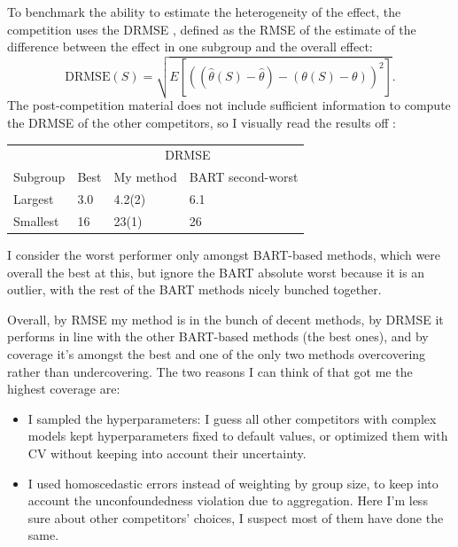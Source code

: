 \documentclass[a4paper]{article}
\theoremstyle{definition}
\begin{document}
    To benchmark the ability to estimate the heterogeneity of the effect, the competition uses the DRMSE \autocite[15]{thal2023}, defined as the RMSE of the estimate of the difference between the effect in one subgroup and the overall effect:
    \begin{equation}
        \mathrm{DRMSE}(S) = \sqrt{E[((\hat\theta(S) - \hat\theta) - (\theta(S) - \theta))^2]}.
    \end{equation}
    The post-competition material does not include sufficient information to compute the DRMSE of the other competitors, so I visually read the results off \textcite[fig.~2, p.~16]{thal2023}:
    \begin{center}
        \begin{tabular}{llll}
            \toprule
            & \multicolumn{3}{c}{DRMSE} \\
            \cline{2-4}
            Subgroup & Best & My method & BART second-worst \\
            \midrule
            Largest & 3.0 & 4.2(2) & 6.1 \\
            Smallest & 16 & 23(1) & 26 \\
            \bottomrule
        \end{tabular}
    \end{center}
    I consider the worst performer only amongst BART-based methods, which were overall the best at this, but ignore the BART absolute worst because it is an outlier, with the rest of the BART methods nicely bunched together.

    Overall, by RMSE my method is in the bunch of decent methods, by DRMSE it performs in line with the other BART-based methods (the best ones), and by coverage it's amongst the best and one of the only two methods overcovering rather than undercovering. The two reasons I can think of that got me the highest coverage are:
    \begin{itemize}
        
        \item I sampled the hyperparameters: I guess all other competitors with complex models kept hyperparameters fixed to default values, or optimized them with CV without keeping into account their uncertainty.

        \item I used homoscedastic errors instead of weighting by group size, to keep into account the unconfoundedness violation due to aggregation. Here I'm less sure about other competitors' choices, I suspect most of them have done the same.

    \end{itemize}
\end{document}
